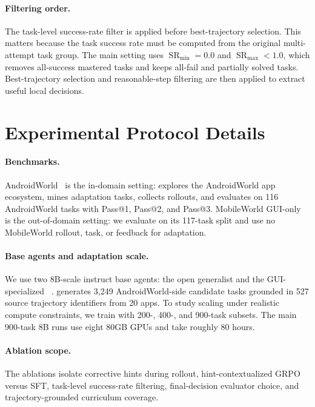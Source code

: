 \paragraph{Filtering order.}
The task-level success-rate filter is applied before best-trajectory selection. This matters because the task success rate must be computed from the original multi-attempt task group. The main setting uses $\operatorname{SR}_{\min}=0.0$ and $\operatorname{SR}_{\max}<1.0$, which removes all-success mastered tasks and keeps all-fail and partially solved tasks. Best-trajectory selection and reasonable-step filtering are then applied to extract useful local decisions.

\section{Experimental Protocol Details}
\label{sec:appendix_experimental_protocol}

\paragraph{Benchmarks.}
AndroidWorld~\citep{rawles2024androidworld} is the in-domain setting: \ourmethod explores the AndroidWorld app ecosystem, mines adaptation tasks, collects \hifpo rollouts, and evaluates on 116 AndroidWorld tasks with Pass@1, Pass@2, and Pass@3. MobileWorld GUI-only~\citep{kong2026mobileworld} is the out-of-domain setting: we evaluate on its 117-task split and use no MobileWorld rollout, task, or feedback for adaptation.

\paragraph{Base agents and adaptation scale.}
We use two 8B-scale instruct base agents: the open generalist  and the GUI-specialized ~\citep{bai2025qwen3,xu2026mobile}. \ourmethod generates 3,249 AndroidWorld-side candidate tasks grounded in 527 source trajectory identifiers from 20 apps. To study scaling under realistic compute constraints, we train with 200-, 400-, and 900-task subsets. The main 900-task 8B runs use eight 80GB GPUs and take roughly 80 hours.

\paragraph{Ablation scope.}
The ablations isolate corrective hints during rollout, hint-contextualized GRPO versus SFT, task-level success-rate filtering, final-decision evaluator choice, and trajectory-grounded curriculum coverage.

